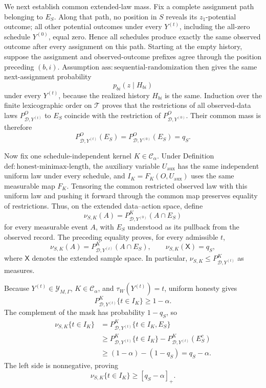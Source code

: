 We next establish common extended-law mass.  Fix a complete assignment path belonging to \(E_S\).  Along that path, no position in \(S\) reveals its \(z_1\)-potential outcome; all other potential outcomes under every \(Y^{(t)}\), including the all-zero schedule \(Y^{(0)}\), equal zero.  Hence all schedules produce exactly the same observed outcome after every assignment on this path.  Starting at the empty history, suppose the assignment and observed-outcome prefixes agree through the position preceding \((b,i)\).  Assumption \(\mathrm{ass:sequential\text{-}randomization}\) then gives the same next-assignment probability
\[
 p_{bi}(z\mid H_{bi})
\]
under every \(Y^{(t)}\), because the realized history \(H_{bi}\) is the same.  Induction over the finite lexicographic order on \(\mathcal T\) proves that the restrictions of all observed-data laws \(P^O_{\mathcal D,Y^{(t)}}\) to \(E_S\) coincide with the restriction of \(P^O_{\mathcal D,Y^{(0)}}\).  Their common mass is therefore
\[
 P^O_{\mathcal D,Y^{(t)}}(E_S)
 =P^O_{\mathcal D,Y^{(0)}}(E_S)
 =q_S.
\]

Now fix one schedule-independent kernel \(K\in\mathcal C_\alpha\).  Under Definition \(\mathrm{def:honest\text{-}minimax\text{-}length}\), the auxiliary variable \(U_{\mathrm{aux}}\) has the same independent uniform law under every schedule, and \(I_K=F_K(O,U_{\mathrm{aux}})\) uses the same measurable map \(F_K\).  Tensoring the common restricted observed law with this uniform law and pushing it forward through the common map preserves equality of restrictions.  Thus, on the extended data--action space, define
\[
 \nu_{S,K}(A)
 =P^K_{\mathcal D,Y^{(0)}}(A\cap E_S)
\]
for every measurable event \(A\), with \(E_S\) understood as its pullback from the observed record.  The preceding equality proves, for every admissible \(t\),
\[
 \nu_{S,K}(A)=P^K_{\mathcal D,Y^{(t)}}(A\cap E_S),
 \qquad
 \nu_{S,K}(\mathsf X)=q_S,
\]
where \(\mathsf X\) denotes the extended sample space.  In particular, \(\nu_{S,K}\le P^K_{\mathcal D,Y^{(t)}}\) as measures.

Because \(Y^{(t)}\in\mathcal Y_{M,\Gamma}\), \(K\in\mathcal C_\alpha\), and \(\tau_W(Y^{(t)})=t\), uniform honesty gives
\[
 P^K_{\mathcal D,Y^{(t)}}\{t\in I_K\}\ge1-\alpha.
\]
The complement of the mask has probability \(1-q_S\), so
\begin{align*}
 \nu_{S,K}\{t\in I_K\}
 &=P^K_{\mathcal D,Y^{(t)}}\{t\in I_K,E_S\}\\
 &\ge P^K_{\mathcal D,Y^{(t)}}\{t\in I_K\}
       -P^K_{\mathcal D,Y^{(t)}}(E_S^c)\\
 &\ge (1-\alpha)-(1-q_S)
 =q_S-\alpha.
\end{align*}
The left side is nonnegative, proving
\[
 \nu_{S,K}\{t\in I_K\}\ge[q_S-\alpha]_+.
\]

